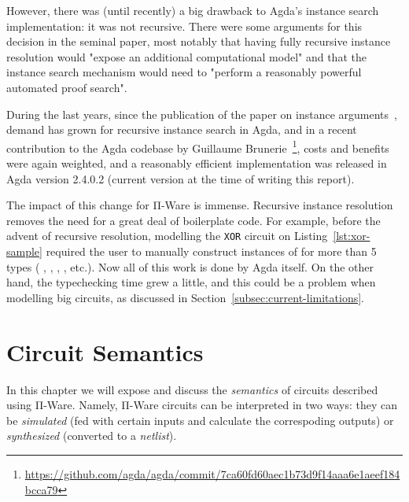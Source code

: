             However, there was (until recently) a big drawback to Agda's instance search implementation:
            it was not recursive.
            There were some arguments for this decision in the seminal paper,
            most notably that having fully recursive instance resolution would
            "expose an additional computational model" and that the instance search mechanism
            would need to "perform a reasonably powerful automated proof search".

            During the last years, since the publication of the paper on instance arguments~\cite{typeclasses-agda},
            demand has grown for recursive instance search in Agda, and in a recent contribution to the Agda codebase
            by Guillaume Brunerie~\footnote{\url{https://github.com/agda/agda/commit/7ca60fd60aec1b73d9f14aaa6e1aeef184bcca79}},
            costs and benefits were again weighted, and a reasonably efficient implementation was released
            in Agda version 2.4.0.2 (current version at the time of writing this report).

            The impact of this change for Π-Ware is immense.
            Recursive instance resolution removes the need for a great deal of boilerplate code.
            For example, before the advent of recursive resolution, modelling the \texttt{XOR} circuit
            on Listing~\ref{lst:xor-sample} required the user to manually construct instances of 
            for more than 5 types
            (   
            , \AY{(}  \AY{)}  
            ,   \AY{(}  \AY{)}
            , \AY{(}  \AY{(}  \AY{)}\AY{)}  \AY{(}  \AY{)}
            , etc.).
            Now all of this work is done by Agda itself.
            On the other hand, the typechecking time grew a little,
            and this could be a problem when modelling big circuits, as discussed in Section~\ref{subsec:current-limitations}.


    \section{Circuit Semantics}
    \label{sec:circuit-semantics}
        In this chapter we will expose and discuss the \emph{semantics} of circuits described using Π-Ware.
        Namely, Π-Ware circuits can be interpreted in two ways:
        they can be \emph{simulated} (fed with certain inputs and calculate the correspoding outputs)
        or \emph{synthesized} (converted to a \emph{netlist}).

